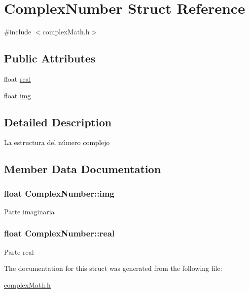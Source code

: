 \hypertarget{structComplexNumber}{}\section{Complex\+Number Struct Reference}
\label{structComplexNumber}


{\ttfamily \#include $<$complex\+Math.\+h$>$}

\subsection*{Public Attributes}
{\bf }\par
\begin{DoxyCompactItemize}
\item 
float \hyperlink{structComplexNumber_a19ded39d7e9f32f1572d13406b5e07ed}{real}
\item 
float \hyperlink{structComplexNumber_aee2a3e161e996b5301691844b1b8f3d2}{img}
\end{DoxyCompactItemize}



\subsection{Detailed Description}
La estructura del número complejo 

\subsection{Member Data Documentation}
\subsubsection[{\texorpdfstring{img}{img}}]{\setlength{\rightskip}{0pt plus 5cm}float Complex\+Number\+::img}\hypertarget{structComplexNumber_aee2a3e161e996b5301691844b1b8f3d2}{}\label{structComplexNumber_aee2a3e161e996b5301691844b1b8f3d2}
Parte imaginaria 
\subsubsection[{\texorpdfstring{real}{real}}]{\setlength{\rightskip}{0pt plus 5cm}float Complex\+Number\+::real}\hypertarget{structComplexNumber_a19ded39d7e9f32f1572d13406b5e07ed}{}\label{structComplexNumber_a19ded39d7e9f32f1572d13406b5e07ed}
Parte real 

The documentation for this struct was generated from the following file\+:\begin{DoxyCompactItemize}
\item 
\hyperlink{complexMath_8h}{complex\+Math.\+h}\end{DoxyCompactItemize}
